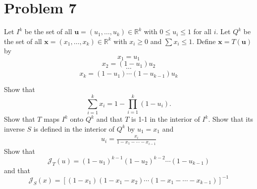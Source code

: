 \documentclass[11pt]{article}
\newcommand{\bbR}{\mathbb{R}}
\begin{document}
\section*{Problem 7}
\begin{problem}
    Let $I^k$ be the set of all $\textbf{u} = (u_1, \dots, u_k)\in \bbR^k$ with $0\leq u_i \leq 1$ for all $i.$ Let $Q^k$ be the set of all $\textbf{x} = (x_1, \dots, x_k)\in \bbR^k$ with $x_i \geq 0$ and $\sum x_i \leq 1.$ Define $\textbf{x} = T(\textbf{u})$ by 
    \[x_1 = u_1\]
    \[x_2 = (1-u_1)u_2\]
    \[\cdots\]
    \[x_k = (1-u_1)\cdots (1-u_{k-1})u_k\]

    Show that 
    \[\sum_{i=1}^k x_i = 1 - \prod_{i=1}^k (1-u_i).\] Show that $T$ maps $I^k$ onto $Q^k$ and that $T$ is 1-1 in the interior of $I^k.$ Show that its inverse $S$ is defined in the interior of $Q^k$ by $u_1 = x_1$ and 
    \begin{align}
    u_i = \frac{x_i}{1 - x_1 - \cdots - x_{i-1}}    
    \end{align}
    Show that 
    \[\mathcal{J}_T(u) = (1-u_1)^{k-1}(1-u_2)^{k-2}\cdots (1-u_{k-1})\] and that 
    \[\mathcal{J}_S(x) = \left[(1-x_1)(1-x_1 - x_2)\cdots (1-x_1 - \cdots - x_{k-1})\right]^{-1}\]
\end{problem}
\end{document}
